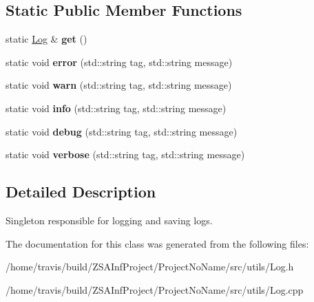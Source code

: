 \subsection*{Static Public Member Functions}
\begin{DoxyCompactItemize}
\item 
\hypertarget{classLog_ad33d94e0b040b898ee4b88cc0b4c0941}{static \hyperlink{classLog}{Log} \& {\bfseries get} ()}\label{classLog_ad33d94e0b040b898ee4b88cc0b4c0941}

\item 
\hypertarget{classLog_ac7b6384ef275acd4982544201b21750c}{static void {\bfseries error} (std\-::string tag, std\-::string message)}\label{classLog_ac7b6384ef275acd4982544201b21750c}

\item 
\hypertarget{classLog_aba264cddc8a3e63c41c203e1b365eebc}{static void {\bfseries warn} (std\-::string tag, std\-::string message)}\label{classLog_aba264cddc8a3e63c41c203e1b365eebc}

\item 
\hypertarget{classLog_a90132d669178c96ef6a0ddf2571d38fb}{static void {\bfseries info} (std\-::string tag, std\-::string message)}\label{classLog_a90132d669178c96ef6a0ddf2571d38fb}

\item 
\hypertarget{classLog_a53a0cc512876c782787a3bfa44d26ea2}{static void {\bfseries debug} (std\-::string tag, std\-::string message)}\label{classLog_a53a0cc512876c782787a3bfa44d26ea2}

\item 
\hypertarget{classLog_a5fb96b3db1f6561689f60d3d9dfe3b8d}{static void {\bfseries verbose} (std\-::string tag, std\-::string message)}\label{classLog_a5fb96b3db1f6561689f60d3d9dfe3b8d}

\end{DoxyCompactItemize}


\subsection{Detailed Description}
Singleton responsible for logging and saving logs. 

The documentation for this class was generated from the following files\-:\begin{DoxyCompactItemize}
\item 
/home/travis/build/\-Z\-S\-A\-Inf\-Project/\-Project\-No\-Name/src/utils/Log.\-h\item 
/home/travis/build/\-Z\-S\-A\-Inf\-Project/\-Project\-No\-Name/src/utils/Log.\-cpp\end{DoxyCompactItemize}
